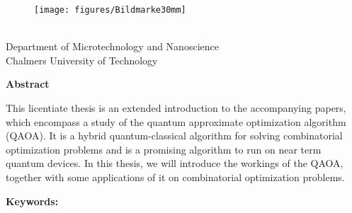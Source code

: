 \documentclass[a4paper,12pt,notitlepage]{article}
\begin{document}
\vspace{0.5cm}

\begin{figure}[h!]
    \centering
    \texttt{[image: figures/Bildmarke30mm]}
\end{figure}

\pagebreak

%

\pagebreak

\thispagestyle{empty}

\begin{center}

{\parbox{\textwidth}{\center\Large \Title}}

\vspace{5mm}

{\large\sc \Name}

\vspace{4mm}

{\small \avdelning \\
Department of Microtechnology and Nanoscience \\
Chalmers University of Technology}

\vspace{1cm}

{\bf Abstract}
\end{center}

\vspace{1mm}

\noindent This licentiate thesis is an extended introduction to the accompanying papers, which encompass a study of the quantum approximate optimization algorithm (QAOA). It is a hybrid quantum-classical algorithm for solving combinatorial optimization problems and is a promising algorithm to run on near term quantum devices. In this thesis, we will introduce the workings of the QAOA, together with some applications of it on combinatorial optimization problems.

\vfill
 
\noindent
\textbf{Keywords:} \Keywords
\vspace{1cm}
\end{document}
